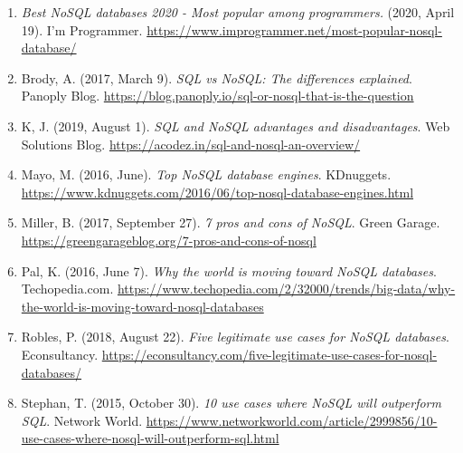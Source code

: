 \documentclass[]{article}
\begin{document}
\begin{enumerate}
	\item \textit{Best NoSQL databases 2020 - Most popular among programmers.} (2020, April 19). I'm Programmer. \url{https://www.improgrammer.net/most-popular-nosql-database/}
	
	\item Brody, A. (2017, March 9). \textit{SQL vs NoSQL: The differences explained}. Panoply Blog. \url{https://blog.panoply.io/sql-or-nosql-that-is-the-question}
	
	\item K, J. (2019, August 1). \textit{SQL and NoSQL advantages and disadvantages}. Web Solutions Blog. \url{https://acodez.in/sql-and-nosql-an-overview/}
	
	\item Mayo, M. (2016, June). \textit{Top NoSQL database engines}. KDnuggets. \url{https://www.kdnuggets.com/2016/06/top-nosql-database-engines.html}
	
	\item Miller, B. (2017, September 27). \textit{7 pros and cons of NoSQL}. Green Garage. \url{https://greengarageblog.org/7-pros-and-cons-of-nosql}
	
	\item Pal, K. (2016, June 7). \textit{Why the world is moving toward NoSQL databases}. Techopedia.com. \url{https://www.techopedia.com/2/32000/trends/big-data/why-the-world-is-moving-toward-nosql-databases}
	
	\item Robles, P. (2018, August 22). \textit{Five legitimate use cases for NoSQL databases}. Econsultancy. \url{https://econsultancy.com/five-legitimate-use-cases-for-nosql-databases/}
	
	\item Stephan, T. (2015, October 30). \textit{10 use cases where NoSQL will outperform SQL}. Network World. \url{https://www.networkworld.com/article/2999856/10-use-cases-where-nosql-will-outperform-sql.html}
\end{enumerate}
\end{document}
